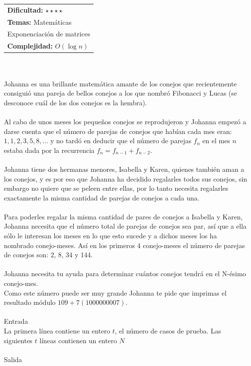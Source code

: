 \documentclass[12pt]{article}
\begin{document}
\hfill
\begin{tabular}{@{}l@{}}
\textbf{Dificultad:} $\star \star \star \star$ \\
\textbf{Temas:} Matemáticas \\ Exponenciación de matrices \\
\textbf{Complejidad:} $O(\log n)$
\end{tabular}\\
\\
Johanna es una brillante matemática amante de los conejos que recientemente consiguió una pareja de bellos conejos a los que nombró Fibonacci y Lucas (se desconoce cuál de los dos conejos es la hembra).\\ \\Al cabo de unos meses los pequeños conejos se reprodujeron y Johanna empezó a darse cuenta que el número de parejas de conejos que habían cada mes eran: $1, 1, 2, 3, 5, 8, ...$ y no tardó en deducir que el número de parejas $f_n$ en el mes $n$ estaba
dada por la recurrencia $f_n = f_{n−1} + f_{n−2}$.\\
\\Johanna tiene dos hermanas menores, Isabella y Karen, quienes también aman a los conejos, y es por eso que Johanna ha decidido regalarles todos sus conejos, sin embargo no quiere que se peleen entre ellas, por lo tanto necesita regalarles exactamente la misma cantidad de parejas de conejos a cada una.\\
\\Para poderles regalar la misma cantidad de pares de conejos a Isabella y Karen, Johanna necesita que el número total de parejas de conejos sea par, así que a ella sólo le interesan los meses en lo que esto sucede y a dichos meses los ha nombrado conejo-meses. Así en los primeros 4 conejo-meses el número de parejas de conejos son: 2, 8, 34
y 144.\\ \\Johanna necesita tu ayuda para determinar cuántos conejos tendrá en el N-ésimo conejo-mes. \\Como este número puede ser muy grande Johanna te pide que imprimas el resultado módulo $109 + 7 (1000000007)$.
\\
\\
\textrm{\large Entrada}
\\
La primera línea contiene un entero $t$, el número de casos de prueba. Las siguientes $t$ líneas contienen un entero $N$
\\
\\
\textrm{\large Salida}
\\
\end{document}
